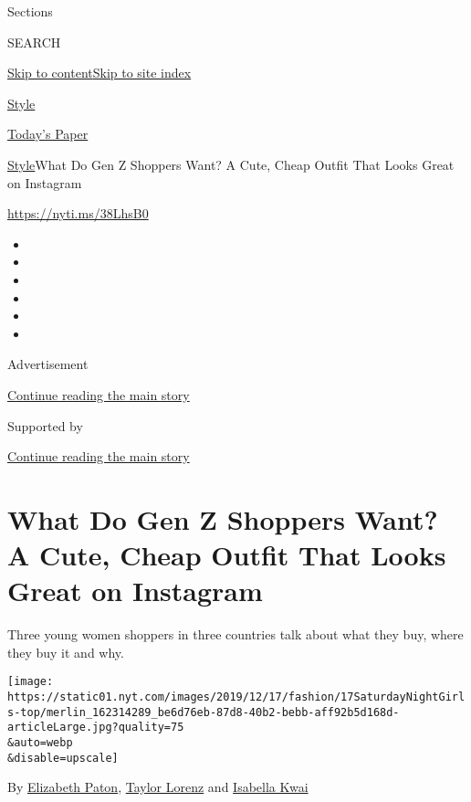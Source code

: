 Sections

SEARCH

\protect\hyperlink{site-content}{Skip to
content}\protect\hyperlink{site-index}{Skip to site index}

\href{https://www.nytimes.com/section/style}{Style}

\href{https://myaccount.nytimes.com/auth/login?response_type=cookie\&client_id=vi}{}

\href{https://www.nytimes.com/section/todayspaper}{Today's Paper}

\href{/section/style}{Style}\textbar{}What Do Gen Z Shoppers Want? A
Cute, Cheap Outfit That Looks Great on Instagram

\url{https://nyti.ms/38LhsB0}

\begin{itemize}
\item
\item
\item
\item
\item
\item
\end{itemize}

Advertisement

\protect\hyperlink{after-top}{Continue reading the main story}

Supported by

\protect\hyperlink{after-sponsor}{Continue reading the main story}

\hypertarget{what-do-gen-z-shoppers-want-a-cute-cheap-outfit-that-looks-great-on-instagram}{%
\section{What Do Gen Z Shoppers Want? A Cute, Cheap Outfit That Looks
Great on
Instagram}\label{what-do-gen-z-shoppers-want-a-cute-cheap-outfit-that-looks-great-on-instagram}}

Three young women shoppers in three countries talk about what they buy,
where they buy it and why.

\texttt{[image: https://static01.nyt.com/images/2019/12/17/fashion/17SaturdayNightGirls-top/merlin\_162314289\_be6d76eb-87d8-40b2-bebb-aff92b5d168d-articleLarge.jpg?quality=75\\\&auto=webp\\\&disable=upscale]}

By \href{https://www.nytimes.com/by/elizabeth-paton}{Elizabeth Paton},
\href{https://www.nytimes.com/by/taylor-lorenz}{Taylor Lorenz} and
\href{https://www.nytimes.com/by/isabella-kwai}{Isabella Kwai}

